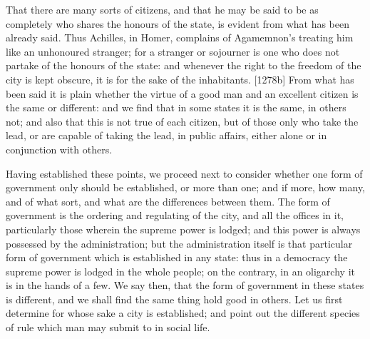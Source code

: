 That there are many sorts of citizens, and that he may be said to be as
completely who shares the honours of the state, is evident from what has
been already said. Thus Achilles, in Homer, complains of Agamemnon's
treating him like an unhonoured stranger; for a stranger or sojourner is
one who does not partake of the honours of the state: and whenever the
right to the freedom of the city is kept obscure, it is for the sake of
the inhabitants. [1278b] From what has been said it is plain whether the
virtue of a good man and an excellent citizen is the same or different:
and we find that in some states it is the same, in others not; and also
that this is not true of each citizen, but of those only who take the
lead, or are capable of taking the lead, in public affairs, either alone
or in conjunction with others.


Having established these points, we proceed next to consider whether one
form of government only should be established, or more than one; and if
more, how many, and of what sort, and what are the differences between
them. The form of government is the ordering and regulating of the city,
and all the offices in it, particularly those wherein the supreme power is
lodged; and this power is always possessed by the administration; but the
administration itself is that particular form of government which is
established in any state: thus in a democracy the supreme power is lodged
in the whole people; on the contrary, in an oligarchy it is in the hands
of a few. We say then, that the form of government in these states is
different, and we shall find the same thing hold good in others. Let us
first determine for whose sake a city is established; and point out the
different species of rule which man may submit to in social life.

